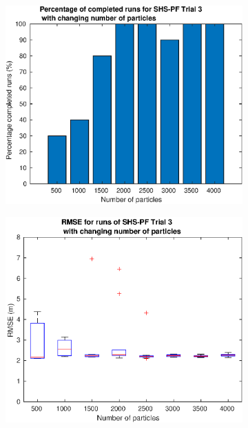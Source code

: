 \begin{figure}[H]
	\centering
	\begin{subfigure}[t]{.4\textwidth}
		\centering
		\includegraphics[width=\linewidth]{images/20201129_1147_Trial_3_nr_particles_1}
		\caption{}
		\label{fig:trial3_nr_particles}
	\end{subfigure} \quad
\begin{subfigure}[t]{.4\textwidth}
	\centering
	\includegraphics[width=\linewidth]{images/20201129_1154_Trial_3_RMSE_nr_particles_1}
	\caption{}
	\label{fig:trial3_nr_particles}
\end{subfigure} \quad
\end{figure}

